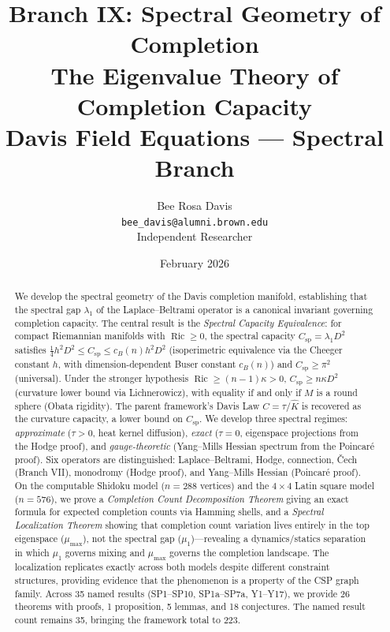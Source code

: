 \documentclass[11pt]{article}
\title{%
\textbf{Branch IX: Spectral Geometry of Completion}\\[6pt]
\large The Eigenvalue Theory of Completion Capacity\\[4pt]
\normalsize Davis Field Equations --- Spectral Branch
}
\author{%
Bee Rosa Davis\\
\texttt{bee\_davis@alumni.brown.edu}\\
Independent Researcher
}
\date{February 2026}
\theoremstyle{definition}
\theoremstyle{remark}
\newcommand{\Ric}{\operatorname{Ric}}
\newcommand{\Csp}{C_{\mathrm{sp}}}
\begin{document}
\maketitle

\begin{abstract}
We develop the spectral geometry of the Davis completion manifold, establishing that the spectral gap $\lambda_1$ of the Laplace--Beltrami operator is a canonical invariant governing completion capacity. The central result is the \emph{Spectral Capacity Equivalence}: for compact Riemannian manifolds with $\Ric \ge 0$, the spectral capacity $\Csp = \lambda_1 D^2$ satisfies $\tfrac{1}{4}h^2 D^2 \le \Csp \le c_B(n) h^2 D^2$ (isoperimetric equivalence via the Cheeger constant $h$, with dimension-dependent Buser constant $c_B(n)$) and $\Csp \ge \pi^2$ (universal). Under the stronger hypothesis $\Ric \ge (n-1)\kappa > 0$, $\Csp \ge n\kappa D^2$ (curvature lower bound via Lichnerowicz), with equality if and only if $M$ is a round sphere (Obata rigidity). The parent framework's Davis Law $C = \tau/\hat{K}$ is recovered as the curvature capacity, a lower bound on $\Csp$. We develop three spectral regimes: \emph{approximate} ($\tau > 0$, heat kernel diffusion), \emph{exact} ($\tau = 0$, eigenspace projections from the Hodge proof), and \emph{gauge-theoretic} (Yang--Mills Hessian spectrum from the Poincar\'{e} proof). Six operators are distinguished: Laplace--Beltrami, Hodge, connection, \v{C}ech (Branch VII), monodromy (Hodge proof), and Yang--Mills Hessian (Poincar\'{e} proof). On the computable Shidoku model ($n = 288$ vertices) and the $4 \times 4$ Latin square model ($n = 576$), we prove a \emph{Completion Count Decomposition Theorem} giving an exact formula for expected completion counts via Hamming shells, and a \emph{Spectral Localization Theorem} showing that completion count variation lives entirely in the top eigenspace ($\mu_{\max}$), not the spectral gap ($\mu_1$)---revealing a dynamics/statics separation in which $\mu_1$ governs mixing and $\mu_{\max}$ governs the completion landscape. The localization replicates exactly across both models despite different constraint structures, providing evidence that the phenomenon is a property of the CSP graph family. Across 35 named results (SP1--SP10, SP1a--SP7a, Y1--Y17), we provide 26 theorems with proofs, 1 proposition, 5 lemmas, and 18 conjectures. The named result count remains 35, bringing the framework total to 223.
\end{abstract}

\tableofcontents
\end{document}
